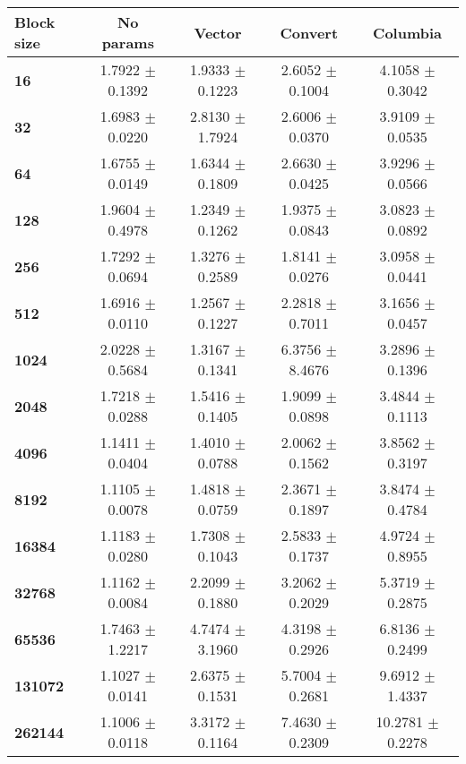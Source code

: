 \begin{tabular}{lcccc}\toprule
\textbf{Block size}  & \textbf{No params} & \textbf{Vector} & \textbf{Convert} & \textbf{Columbia}\\\midrule
\textbf{16}  & 1.7922 $\pm$ 0.1392 & 1.9333 $\pm$ 0.1223 & 2.6052 $\pm$ 0.1004 & 4.1058 $\pm$ 0.3042\\
\textbf{32}  & 1.6983 $\pm$ 0.0220 & 2.8130 $\pm$ 1.7924 & 2.6006 $\pm$ 0.0370 & 3.9109 $\pm$ 0.0535\\
\textbf{64}  & 1.6755 $\pm$ 0.0149 & 1.6344 $\pm$ 0.1809 & 2.6630 $\pm$ 0.0425 & 3.9296 $\pm$ 0.0566\\
\textbf{128}  & 1.9604 $\pm$ 0.4978 & 1.2349 $\pm$ 0.1262 & 1.9375 $\pm$ 0.0843 & 3.0823 $\pm$ 0.0892\\
\textbf{256}  & 1.7292 $\pm$ 0.0694 & 1.3276 $\pm$ 0.2589 & 1.8141 $\pm$ 0.0276 & 3.0958 $\pm$ 0.0441\\
\textbf{512}  & 1.6916 $\pm$ 0.0110 & 1.2567 $\pm$ 0.1227 & 2.2818 $\pm$ 0.7011 & 3.1656 $\pm$ 0.0457\\
\textbf{1024}  & 2.0228 $\pm$ 0.5684 & 1.3167 $\pm$ 0.1341 & 6.3756 $\pm$ 8.4676 & 3.2896 $\pm$ 0.1396\\
\textbf{2048}  & 1.7218 $\pm$ 0.0288 & 1.5416 $\pm$ 0.1405 & 1.9099 $\pm$ 0.0898 & 3.4844 $\pm$ 0.1113\\
\textbf{4096}  & 1.1411 $\pm$ 0.0404 & 1.4010 $\pm$ 0.0788 & 2.0062 $\pm$ 0.1562 & 3.8562 $\pm$ 0.3197\\
\textbf{8192}  & 1.1105 $\pm$ 0.0078 & 1.4818 $\pm$ 0.0759 & 2.3671 $\pm$ 0.1897 & 3.8474 $\pm$ 0.4784\\
\textbf{16384}  & 1.1183 $\pm$ 0.0280 & 1.7308 $\pm$ 0.1043 & 2.5833 $\pm$ 0.1737 & 4.9724 $\pm$ 0.8955\\
\textbf{32768}  & 1.1162 $\pm$ 0.0084 & 2.2099 $\pm$ 0.1880 & 3.2062 $\pm$ 0.2029 & 5.3719 $\pm$ 0.2875\\
\textbf{65536}  & 1.7463 $\pm$ 1.2217 & 4.7474 $\pm$ 3.1960 & 4.3198 $\pm$ 0.2926 & 6.8136 $\pm$ 0.2499\\
\textbf{131072}  & 1.1027 $\pm$ 0.0141 & 2.6375 $\pm$ 0.1531 & 5.7004 $\pm$ 0.2681 & 9.6912 $\pm$ 1.4337\\
\textbf{262144} & 1.1006 $\pm$ 0.0118 & 3.3172 $\pm$ 0.1164 & 7.4630 $\pm$ 0.2309 & 10.2781 $\pm$ 0.2278\\
\bottomrule
\end{tabular}
